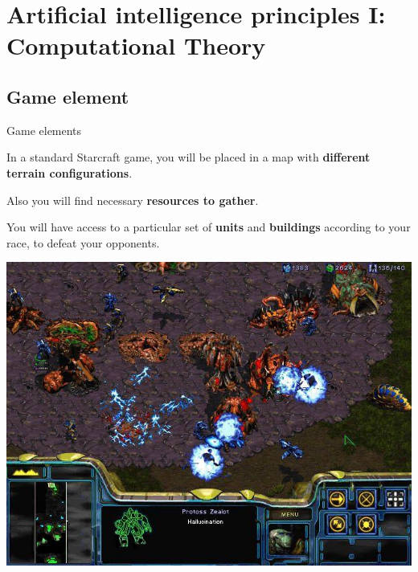 \documentclass[10pt]{beamer}
\begin{document}
\section{Artificial intelligence principles I: Computational Theory}

\subsection{Game element}
\begin{frame}{Game elements}

In a standard Starcraft game, you will be placed in a map with \textbf{different terrain configurations}.\newline

Also you will find necessary \textbf{resources to gather}.\newline

You will have access to a particular set of \textbf{units} and \textbf{buildings} according to your race, to defeat your opponents.

\begin{center}
	  \includegraphics[scale=0.3]{gam1.jpg}
\end{center}
\end{frame}
\end{document}
